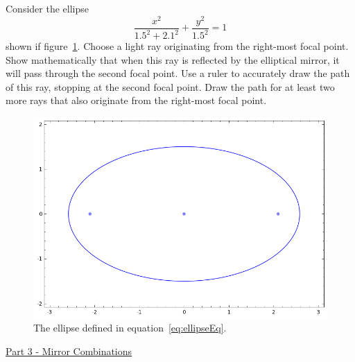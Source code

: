 Consider the ellipse
%
\begin{equation}
\label{eq:ellipseEq}
\frac{x^2}{1.5^2 + 2.1^2} + \frac{y^2}{1.5^2} = 1
\end{equation}
%
shown if figure~\ref{fig:ellipsePlot}.
Choose a light ray originating from the right-most focal point.
Show mathematically that when this ray is reflected by the elliptical mirror, it will pass through the second focal point.
Use a ruler to accurately draw the path of this ray, stopping at the second focal point.
Draw the path for at least two more rays that also originate from the right-most focal point.
%
\begin{figure}[!h]
\centering
\includegraphics[scale=0.85]{figures/optics-mirrors/ellipsePlot.png}
\caption{The ellipse defined in equation~\ref{eq:ellipseEq}.}
\label{fig:ellipsePlot}
\end{figure}


\hfill \break
\underline{Part 3 - Mirror Combinations}
\hfill \break

